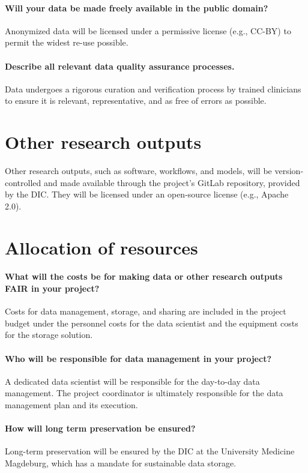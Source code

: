 \documentclass[11pt, a4paper]{article}
\begin{document}
\paragraph{Will your data be made freely available in the public domain?}
Anonymized data will be licensed under a permissive license (e.g., CC-BY) to permit the widest re-use possible.

\paragraph{Describe all relevant data quality assurance processes.}
Data undergoes a rigorous curation and verification process by trained clinicians to ensure it is relevant, representative, and as free of errors as possible.

\section*{Other research outputs}
Other research outputs, such as software, workflows, and models, will be version-controlled and made available through the project's GitLab repository, provided by the DIC. They will be licensed under an open-source license (e.g., Apache 2.0).

\section*{Allocation of resources}

\paragraph{What will the costs be for making data or other research outputs FAIR in your project?}
Costs for data management, storage, and sharing are included in the project budget under the personnel costs for the data scientist and the equipment costs for the storage solution.

\paragraph{Who will be responsible for data management in your project?}
A dedicated data scientist will be responsible for the day-to-day data management. The project coordinator is ultimately responsible for the data management plan and its execution.

\paragraph{How will long term preservation be ensured?}
Long-term preservation will be ensured by the DIC at the University Medicine Magdeburg, which has a mandate for sustainable data storage.
\end{document}
